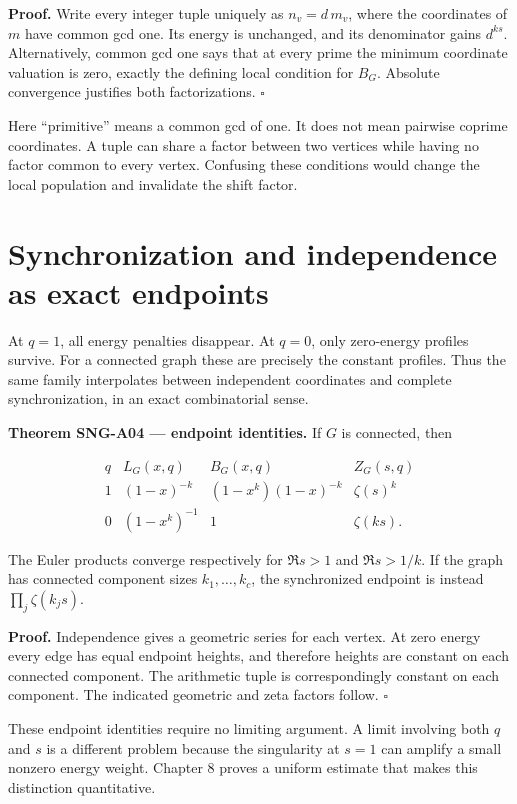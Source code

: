 \documentclass[
  11pt,
  a4paper,
]{report}
\begin{document}
\textbf{Proof.} Write every integer tuple uniquely as \(n_v=d\,m_v\),
where the coordinates of \(m\) have common gcd one. Its energy is
unchanged, and its denominator gains \(d^{ks}\). Alternatively, common
gcd one says that at every prime the minimum coordinate valuation is
zero, exactly the defining local condition for \(B_G\). Absolute
convergence justifies both factorizations. \(\square\)

Here ``primitive'' means a common gcd of one. It does not mean pairwise
coprime coordinates. A tuple can share a factor between two vertices
while having no factor common to every vertex. Confusing these
conditions would change the local population and invalidate the shift
factor.

\hypertarget{synchronization-and-independence-as-exact-endpoints}{%
\section{Synchronization and independence as exact
endpoints}\label{synchronization-and-independence-as-exact-endpoints}}

At \(q=1\), all energy penalties disappear. At \(q=0\), only zero-energy
profiles survive. For a connected graph these are precisely the constant
profiles. Thus the same family interpolates between independent
coordinates and complete synchronization, in an exact combinatorial
sense.

\textbf{Theorem SNG-A04 --- endpoint identities.} If \(G\) is connected,
then

\[
 \begin{array}{c|c|c|c}
 q&L_G(x,q)&B_G(x,q)&Z_G(s,q)\\\hline
 1&(1-x)^{-k}&(1-x^k)(1-x)^{-k}&\zeta(s)^k\\
 0&(1-x^k)^{-1}&1&\zeta(ks).
 \end{array}
\]

The Euler products converge respectively for \(\Re s>1\) and
\(\Re s>1/k\). If the graph has connected component sizes
\(k_1,\ldots,k_c\), the synchronized endpoint is instead
\(\prod_j\zeta(k_js)\).

\textbf{Proof.} Independence gives a geometric series for each vertex.
At zero energy every edge has equal endpoint heights, and therefore
heights are constant on each connected component. The arithmetic tuple
is correspondingly constant on each component. The indicated geometric
and zeta factors follow. \(\square\)

These endpoint identities require no limiting argument. A limit
involving both \(q\) and \(s\) is a different problem because the
singularity at \(s=1\) can amplify a small nonzero energy weight.
Chapter 8 proves a uniform estimate that makes this distinction
quantitative.
\end{document}
